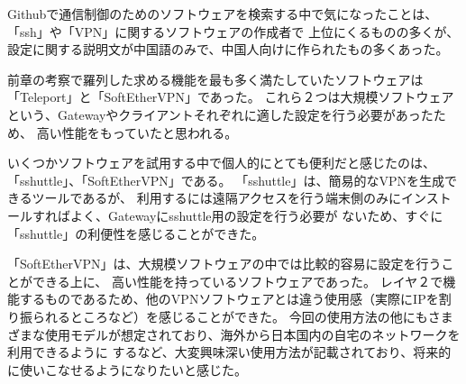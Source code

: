 \documentclass[11pt,a4j,titlepage]{jreport}
\begin{document}
Githubで通信制御のためのソフトウェアを検索する中で気になったことは、「ssh」や「VPN」に関するソフトウェアの作成者で
上位にくるものの多くが、設定に関する説明文が中国語のみで、中国人向けに作られたもの多くあった。

\fi

前章の考察で羅列した求める機能を最も多く満たしていたソフトウェアは「Teleport」と「SoftEtherVPN」であった。
これら２つは大規模ソフトウェアという、Gatewayやクライアントそれぞれに適した設定を行う必要があったため、
高い性能をもっていたと思われる。\par
いくつかソフトウェアを試用する中で個人的にとても便利だと感じたのは、「sshuttle」、「SoftEtherVPN」である。
「sshuttle」は、簡易的なVPNを生成できるツールであるが、
利用するには遠隔アクセスを行う端末側のみにインストールすればよく、Gatewayにsshuttle用の設定を行う必要が
ないため、すぐに「sshuttle」の利便性を感じることができた。\par
「SoftEtherVPN」は、大規模ソフトウェアの中では比較的容易に設定を行うことができる上に、
高い性能を持っているソフトウェアであった。
レイヤ２で機能するものであるため、他のVPNソフトウェアとは違う使用感（実際にIPを割り振られるところなど）を感じることができた。
今回の使用方法の他にもさまざまな使用モデルが想定されており、海外から日本国内の自宅のネットワークを利用できるように
するなど、大変興味深い使用方法が記載されており、将来的に使いこなせるようになりたいと感じた。


















\end{document}
